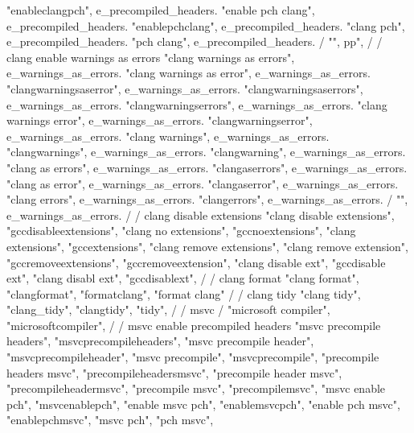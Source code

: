 {{{{        "enableclangpch", e_precompiled_headers. 
        "enable pch clang", e_precompiled_headers. 
        "enablepchclang", e_precompiled_headers. 
        "clang pch", e_precompiled_headers. 
        "pch clang", e_precompiled_headers. 
        / {"", pp"},
        /
        / clang enable warnings as errors
        "clang warnings as errors", e_warnings_as_errors.
        "clang warnings as error", e_warnings_as_errors.
        "clangwarningsaserror", e_warnings_as_errors.
        "clangwarningsaserrors", e_warnings_as_errors.
        "clangwarningserrors", e_warnings_as_errors.
        "clang warnings error", e_warnings_as_errors.
        "clangwarningserror", e_warnings_as_errors.
        "clang warnings", e_warnings_as_errors.
        "clangwarnings", e_warnings_as_errors.
        "clangwarning", e_warnings_as_errors.
        "clang as errors", e_warnings_as_errors.
        "clangaserrors", e_warnings_as_errors.
        "clang as error", e_warnings_as_errors.
        "clangaserror", e_warnings_as_errors.
        "clang errors", e_warnings_as_errors.
        "clangerrors", e_warnings_as_errors.
        / {"", e_warnings_as_errors.
        /
        / clang disable extensions 
        "clang disable extensions", 
        "gccdisableextensions", 
        "clang no extensions", 
        "gccnoextensions", 
        "clang extensions", 
        "gccextensions", 
        "clang remove extensions", 
        "clang remove extension", 
        "gccremoveextensions", 
        "gccremoveextension", 
        "clang disable ext", 
        "gccdisable ext", 
        "clang disabl ext", 
        "gccdisablext", 
        /
        / clang format 
        "clang format",
        "clangformat",
        "formatclang",
        "format clang"
        /
        / clang tidy 
        "clang tidy",  
        "clang_tidy", "clangtidy", "tidy",  
        /
        / msvc  
        / {"microsoft compiler", "microsoftcompiler",  
        /
        / msvc enable precompiled headers 
        "msvc precompile headers",  
        "msvcprecompileheaders",  
        "msvc precompile header",  
        "msvcprecompileheader",  
        "msvc precompile",  
        "msvcprecompile",  
        "precompile headers msvc",  
        "precompileheadersmsvc",  
        "precompile header msvc",  
        "precompileheadermsvc",  
        "precompile msvc",  
        "precompilemsvc",  
        "msvc enable pch",  
        "msvcenablepch",  
        "enable msvc pch",  
        "enablemsvcpch",  
        "enable pch msvc",  
        "enablepchmsvc",  
        "msvc pch",  
        "pch msvc",  
}}}}}}
